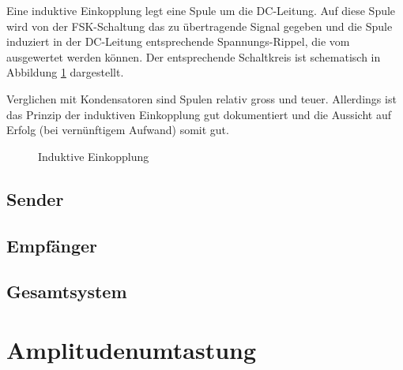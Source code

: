 Eine induktive Einkopplung legt eine  Spule um die DC-Leitung. Auf diese Spule
wird von der FSK-Schaltung das zu  \"ubertragende Signal gegeben und die Spule
induziert in  der DC-Leitung  entsprechende Spannungs-Rippel, die  vom \Master
ausgewertet werden k\"onnen. Der entsprechende  Schaltkreis ist schematisch in
Abbildung \ref{fig:circ:coupling:inductive} dargestellt.

Verglichen mit  Kondensatoren sind Spulen relativ  gross und teuer. Allerdings
ist das Prinzip  der induktiven Einkopplung gut dokumentiert  und die Aussicht
auf Erfolg (bei vern\"unftigem Aufwand) somit gut.

\begin{figure}[h!tb]
    \centering
    
    \caption{Induktive Einkopplung}
    \label{fig:circ:coupling:inductive}
\end{figure}

\subsection{Sender}
\label{sec:simu:fsk:inductive:transmitter}

\subsection{Empf\"anger}
\label{sec:simu:fsk:inductive:receiver}

\subsection{Gesamtsystem}
\label{sec:simu:fsk:inductive:inductive}


\section{Amplitudenumtastung}
\label{sec:simu:ask}


